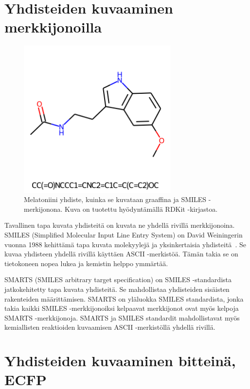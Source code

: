 \documentclass[finnish,twoside,censored,tkt,sw-line]{HYthesisML}
\begin{document}
\section{Yhdisteiden kuvaaminen merkkijonoilla}

\begin{figure}[ht]
    \centering
    \includegraphics[width=8cm, height=8cm]{melatonin-smiles.png}
    \caption{Melatoniini yhdiste, kuinka se kuvataan graaffina ja SMILES -merkijonona.
        Kuva on tuotettu hyödyntämällä RDKit -kirjastoa.}
\end{figure}

Tavallinen tapa kuvata yhdisteitä on kuvata ne yhdellä rivillä merkkijonoina.
SMILES (Simplified Molecular Input Line Entry System) on David Weiningerin vuonna 1988 kehittämä tapa kuvata molekyylejä ja yksinkertaisia yhdisteitä~\cite{WeiningerSMILES}.
Se kuvaa yhdisteen yhdellä rivillä käyttäen ASCII -merkistöä.
Tämän takia se on tietokoneen nopea lukea ja kemistin helppo ymmärtää.

SMARTS (SMILES arbitrary target specification) on SMILES -standardista jatkokehitetty tapa kuvata yhdisteitä.
Se mahdollistaa yhdisteiden sisäisten rakenteiden määrittämisen.
SMARTS on yläluokka SMILES standardista, jonka takia kaikki SMILES -merkkijonoiksi kelpaavat merkkijonot ovat myös kelpoja SMARTS -merkkijonoja.
SMARTS ja SMILES standardit mahdollistavat myös kemiallisten reaktioiden kuvaamisen ASCII -merkistöllä yhdellä rivillä.

\section{Yhdisteiden kuvaaminen bitteinä, ECFP}
\end{document}
